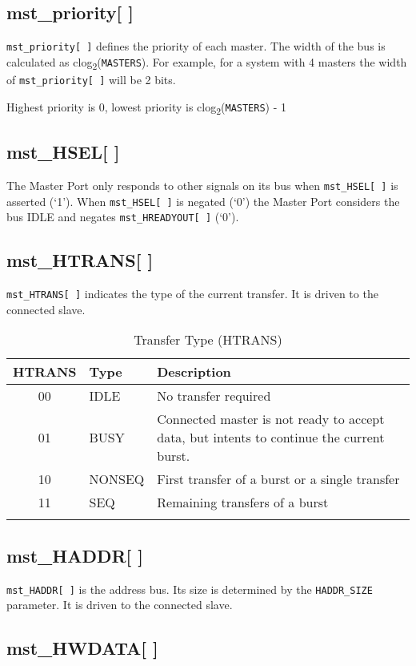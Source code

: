 \subsection{mst\_priority[ ]}\label{mst_priority}

\texttt{mst\_priority[\,]} defines the priority of each master. The width of the bus is calculated as clog\textsubscript{2}(\texttt{MASTERS}). For example, for a system with 4 masters the width of \texttt{mst\_priority[\,]} will be 2 bits.

Highest priority is 0, lowest priority is clog\textsubscript{2}(\texttt{MASTERS}) - 1

\subsection{mst\_HSEL[ ]}\label{mst_hsel}

The Master Port only responds to other signals on its bus when \texttt{mst\_HSEL[\,]} is
asserted (`1'). When \texttt{mst\_HSEL[\,]} is negated (`0') the Master Port
considers the bus IDLE and negates \texttt{mst\_HREADYOUT[\,]} (`0').

\subsection{mst\_HTRANS[ ]}\label{mst_htrans}

\texttt{mst\_HTRANS[ ]} indicates the type of the current transfer. It is driven to
the connected slave.

\begin{longtable}[]{@{}clp{9cm}@{}}
\toprule
HTRANS & Type & Description\tabularnewline
\midrule
\endhead
00 & IDLE & No transfer required\tabularnewline
01 & BUSY & Connected master is not ready to accept data, but intents to
continue the current burst.\tabularnewline
10 & NONSEQ & First transfer of a burst or a single
transfer\tabularnewline
11 & SEQ & Remaining transfers of a burst\tabularnewline
\bottomrule
\caption{Transfer Type (HTRANS)}
\end{longtable}


\subsection{mst\_HADDR[ ]}\label{mst_haddr}

\texttt{mst\_HADDR[\,]} is the address bus. Its size is determined by the \texttt{HADDR\_SIZE}
parameter. It is driven to the connected slave.

\subsection{mst\_HWDATA[ ]}\label{mst_hwdata}


